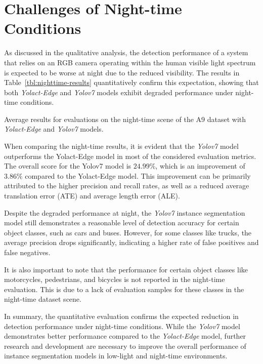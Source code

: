 
\section{Challenges of Night-time Conditions}
\label{sec:weather}

As discussed in the qualitative analysis, the detection performance of a system that relies on an RGB camera operating within the human visible light spectrum is expected to be worse at night due to the reduced visibility.
The results in Table~\ref{tbl:nighttime-results} quantitatively confirm this expectation, showing that both \textit{Yolact-Edge} and \textit{Yolov7} models exhibit degraded performance under night-time conditions.

\begin{table}[h!]
    
    \caption{Average results for evaluations on the night-time scene of the A9 dataset with \textit{Yolact-Edge} and \textit{Yolov7} models.}
    \label{tbl:nighttime-results}
\end{table}

When comparing the night-time results, it is evident that the \textit{Yolov7} model outperforms the Yolact-Edge model in most of the considered evaluation metrics.
The overall score for the Yolov7 model is $24.99\%$, which is an improvement of $3.86\%$ compared to the Yolact-Edge model.
This improvement can be primarily attributed to the higher precision and recall rates, as well as a reduced average translation error (ATE) and average length error (ALE).

Despite the degraded performance at night, the \textit{Yolov7} instance segmentation model still demonstrates a reasonable level of detection accuracy for certain object classes, such as cars and buses.
However, for some classes like trucks, the average precision drops significantly, indicating a higher rate of false positives and false negatives.

It is also important to note that the performance for certain object classes like motorcycles, pedestrians, and bicycles is not reported in the night-time evaluation.
This is due to a lack of evaluation samples for these classes in the night-time dataset scene.

In summary, the quantitative evaluation confirms the expected reduction in detection performance under night-time conditions.
While the \textit{Yolov7} model demonstrates better performance compared to the \textit{Yolact-Edge} model, further research and development are necessary to improve the overall performance of instance segmentation models in low-light and night-time environments.

